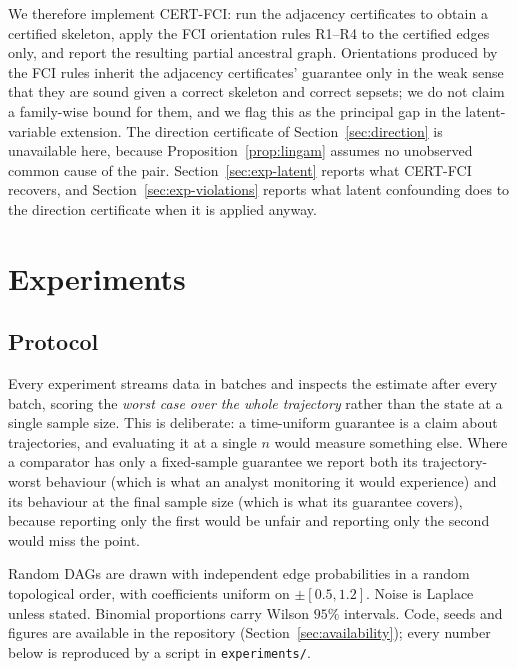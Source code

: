\documentclass[pdflatex,sn-apa]{sn-jnl}
\theoremstyle{thmstyleone}%
\theoremstyle{thmstyletwo}%
\theoremstyle{thmstylethree}%
\begin{document}
We therefore implement CERT-FCI: run the adjacency certificates to obtain a
certified skeleton, apply the FCI orientation rules R1--R4 \citep[originally
][in the formulation of \citealp{zhang2008completeness}]{spirtes1995causal} to the certified edges only, and
report the resulting partial ancestral graph. Orientations produced by the FCI
rules inherit the adjacency certificates' guarantee only in the weak sense
that they are sound given a correct skeleton and correct sepsets; we do not
claim a family-wise bound for them, and we flag this as the principal gap in
the latent-variable extension. The direction certificate of
Section~\ref{sec:direction} is unavailable here, because
Proposition~\ref{prop:lingam} assumes no unobserved common cause of the pair.
Section~\ref{sec:exp-latent} reports what CERT-FCI recovers, and
Section~\ref{sec:exp-violations} reports what latent confounding does to the
direction certificate when it is applied anyway.

\section{Experiments}\label{sec:experiments}

\subsection{Protocol}\label{sec:protocol}

Every experiment streams data in batches and inspects the estimate after every
batch, scoring the \emph{worst case over the whole trajectory} rather than the
state at a single sample size. This is deliberate: a time-uniform guarantee is
a claim about trajectories, and evaluating it at a single $n$ would measure
something else. Where a comparator has only a fixed-sample guarantee we report
both its trajectory-worst behaviour (which is what an analyst monitoring it
would experience) and its behaviour at the final sample size (which is what
its guarantee covers), because reporting only the first would be unfair and
reporting only the second would miss the point.

Random DAGs are drawn with independent edge probabilities in a random
topological order, with coefficients uniform on $\pm[0.5, 1.2]$. Noise is
Laplace unless stated. Binomial proportions carry Wilson $95\%$ intervals.
Code, seeds and figures are available in the repository
(Section~\ref{sec:availability}); every number below is reproduced by a
script in \texttt{experiments/}.
\end{document}
